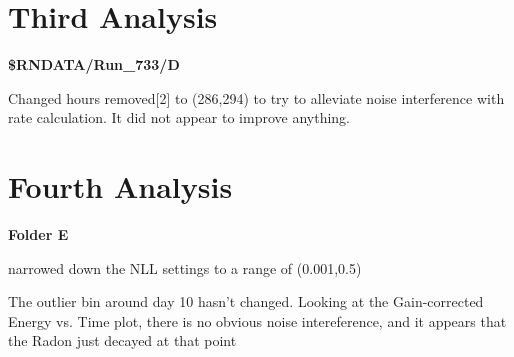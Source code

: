 \documentclass[letterpaper,12pt]{article}
\begin{document}
\section*{Third Analysis}
\textbf{\$RNDATA/Run\_733/D}

Changed hours removed[2] to (286,294) to try to alleviate noise interference with 
rate calculation.
It did not appear to improve anything.

\section*{Fourth Analysis}
\textbf{Folder E}

narrowed down the NLL settings to a range of (0.001,0.5)


The outlier bin around day 10 hasn't changed. Looking at the Gain-corrected
Energy vs. Time plot, there is no obvious noise intereference, and it appears
that the Radon just decayed at that point
\end{document}
